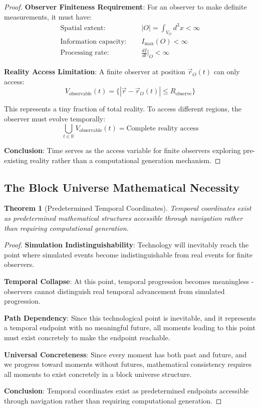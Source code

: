 \documentclass[12pt,a4paper]{article}
\newtheorem{theorem}{Theorem}[section]
\begin{document}
\begin{proof}
\textbf{Observer Finiteness Requirement}: For an observer to make definite measurements, it must have:
\begin{align}
\text{Spatial extent: } &\quad |O| = \int_{V_O} d^3x < \infty \\
\text{Information capacity: } &\quad I_{\max}(O) < \infty \\
\text{Processing rate: } &\quad \frac{dI}{dt}\Big|_O < \infty
\end{align}

\textbf{Reality Access Limitation}: A finite observer at position $\vec{r}_O(t)$ can only access:
$$V_{\text{observable}}(t) = \{|\vec{r}-\vec{r}_O(t)| \leq R_{\text{observe}}\}$$

This represents a tiny fraction of total reality. To access different regions, the observer must evolve temporally:
$$\bigcup_{t \in \mathbb{R}} V_{\text{observable}}(t) = \text{Complete reality access}$$

\textbf{Conclusion}: Time serves as the access variable for finite observers exploring pre-existing reality rather than a computational generation mechanism.
\end{proof}

\subsection{The Block Universe Mathematical Necessity}

\begin{theorem}[Predetermined Temporal Coordinates]
Temporal coordinates exist as predetermined mathematical structures accessible through navigation rather than requiring computational generation.
\end{theorem}

\begin{proof}
\textbf{Simulation Indistinguishability}: Technology will inevitably reach the point where simulated events become indistinguishable from real events for finite observers.

\textbf{Temporal Collapse}: At this point, temporal progression becomes meaningless - observers cannot distinguish real temporal advancement from simulated progression.

\textbf{Path Dependency}: Since this technological point is inevitable, and it represents a temporal endpoint with no meaningful future, all moments leading to this point must exist concretely to make the endpoint reachable.

\textbf{Universal Concreteness}: Since every moment has both past and future, and we progress toward moments without futures, mathematical consistency requires all moments to exist concretely in a block universe structure.

\textbf{Conclusion}: Temporal coordinates exist as predetermined endpoints accessible through navigation rather than requiring computational generation.
\end{proof}
\end{document}
